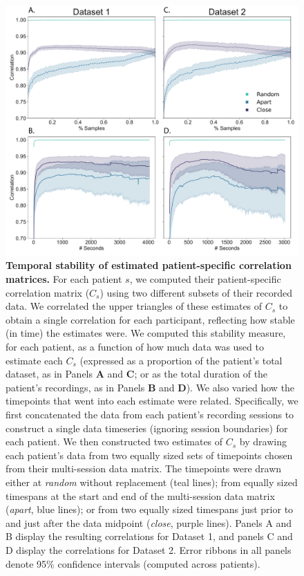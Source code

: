 \documentclass[11pt]{article}
\begin{document}
\begin{figure}[p]
\centering \includegraphics[width=\textwidth]{figs/supplemental_7}
\caption{\textbf{Temporal stability of estimated patient-specific correlation
matrices.}  For each patient $s$, we computed their patient-specific correlation
matrix ($C_s$) using two different subsets of their recorded data.  We
correlated the upper triangles of these estimates of $C_s$ to obtain a single
correlation for each participant, reflecting how stable (in time) the estimates
were.  We computed this stability measure, for each patient, as a function of
how much data was used to estimate each $C_s$ (expressed as a proportion of the
patient's total dataset, as in Panels \textbf{A} and \textbf{C}; or as the total duration of the
patient's recordings, as in Panels \textbf{B} and \textbf{D}).  We also varied how the timepoints
that went into each estimate were related. Specifically, we first concatenated the data from each patient's recording sessions to
construct a single data timeseries (ignoring session boundaries) for each patient.  We then constructed two
estimates of $C_s$ by drawing each patient's data from two equally sized sets of timepoints chosen from their multi-session data matrix.
The timepoints were drawn either at \textit{random} without replacement (teal lines); from equally sized timespans at the start and end of the multi-session data matrix (\textit{apart}, blue lines); or from two equally sized timespans just prior to and just after the data midpoint (\textit{close}, purple lines).  Panels A and B display the resulting correlations for Dataset 1, and panels C and D display the correlations for Dataset 2.
Error ribbons in all panels denote 95\% confidence intervals (computed across patients).}
\label{fig:supplemental_7}
\end{figure}
\end{document}
